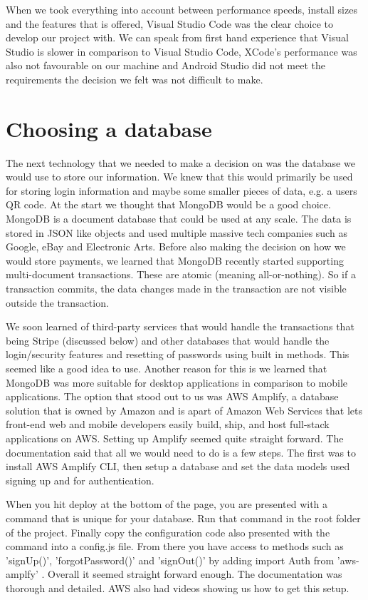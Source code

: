 When we took everything into account between performance speeds, install sizes and the features that is offered, Visual Studio Code was the clear choice to develop our project with. We can speak from first hand experience that Visual Studio is slower in comparison to Visual Studio Code, XCode's performance was also not favourable on our machine and Android Studio did not meet the requirements the decision we felt was not difficult to make. 
\section{Choosing a database}
The next technology that we needed to make a decision on was the database we would use to store our information. We knew that this would primarily be used for storing login information and maybe some smaller pieces of data, e.g. a users QR code. At the start we thought that MongoDB would be a good choice. MongoDB is a document database\cite{mongodb} that could be used at any scale. The data is stored in JSON like objects and used multiple massive tech companies such as Google, eBay and Electronic Arts. Before also making the decision on how we would store payments, we learned that MongoDB recently started supporting multi-document transactions. These are atomic (meaning all-or-nothing)\cite{mongodbTransaction}. So if a transaction commits, the data changes made in the transaction are not visible outside the transaction.

We soon learned of third-party services that would handle the transactions that being Stripe (discussed below) and other databases that would handle the login/security features and resetting of passwords using built in methods. This seemed like a good idea to use. Another reason for this is we learned that MongoDB was more suitable for desktop applications in comparison to mobile applications. The option that stood out to us was AWS Amplify, a database solution that is owned by Amazon and is apart of Amazon Web Services that lets front-end web and mobile developers easily build, ship, and host full-stack applications on AWS. Setting up Amplify seemed quite straight forward. The documentation said that all we would need to do is a few steps. The first was to install AWS Amplify CLI, then setup a database and set the data models used signing up and for authentication\cite{amplify}. 

When you hit deploy at the bottom of the page, you are presented with a command that is unique for your database. Run that command in the root folder of the project. Finally copy the configuration code also presented with the command into a config.js file. From there you have access to methods such as 'signUp()', 'forgotPassword()' and 'signOut()' by adding import Auth from 'aws-amplfy' . Overall it seemed straight forward enough. The documentation was thorough and detailed. AWS also had videos showing us how to get this setup. 


